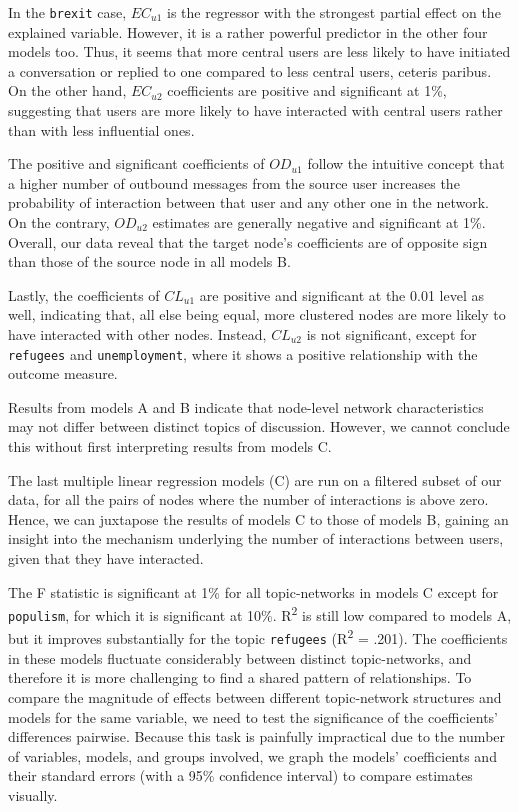 In the \texttt{brexit} case, $EC_{u1}$ is the regressor with the strongest partial effect on the explained variable. However, it is a rather powerful predictor in the other four models too. Thus, it seems that more central users are less likely to have initiated a conversation or replied to one compared to less central users, ceteris paribus. On the other hand, $EC_{u2}$ coefficients are positive and significant at 1\%, suggesting that users are more likely to have interacted with central users rather than with less influential ones.

The positive and significant coefficients of $OD_{u1}$ follow the intuitive concept that a higher number of outbound messages from the source user increases the probability of interaction between that user and any other one in the network. On the contrary, $OD_{u2}$ estimates are generally negative and significant at 1\%. Overall, our data reveal that the target node's coefficients are of opposite sign than those of the source node in all models B.

Lastly, the coefficients of $CL_{u1}$ are positive and significant at the 0.01 level as well, indicating that, all else being equal, more clustered nodes are more likely to have interacted with other nodes. Instead, $CL_{u2}$ is not significant, except for \texttt{refugees} and \texttt{unemployment}, where it shows a positive relationship with the outcome measure.

Results from models A and B indicate that node-level network characteristics may not differ between distinct topics of discussion. However, we cannot conclude this without first interpreting results from models C.

The last multiple linear regression models (C) are run on a filtered subset of our data, for all the pairs of nodes where the number of interactions is above zero. Hence, we can juxtapose the results of models C to those of models B, gaining an insight into the mechanism underlying the number of interactions between users, given that they have interacted.

The F statistic is significant at 1\% for all topic-networks in models C except for \texttt{populism}, for which it is significant at 10\%. R\textsuperscript{2} is still low compared to models A, but it improves substantially for the topic \texttt{refugees} (R\textsuperscript{2} = .201). The coefficients in these models fluctuate considerably between distinct topic-networks, and therefore it is more challenging to find a shared pattern of relationships. To compare the magnitude of effects between different topic-network structures and models for the same variable, we need to test the significance of the coefficients' differences pairwise. Because this task is painfully impractical due to the number of variables, models, and groups involved, we graph the models' coefficients and their standard errors (with a 95\% confidence interval) to compare estimates visually.

